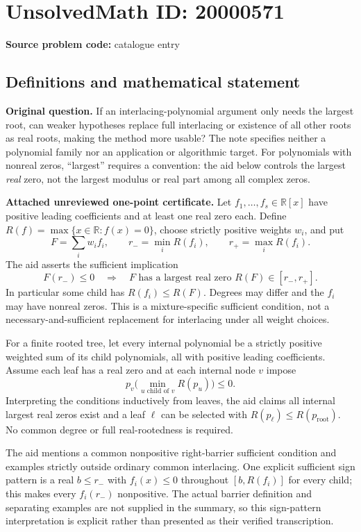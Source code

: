 \documentclass[11pt]{article}
\newcommand{\R}{\mathbb{R}}
\begin{document}
\section*{UnsolvedMath ID: 20000571}
\textbf{Source problem code:} catalogue entry
\subsection{Definitions and mathematical statement}
\textbf{Original question.} If an interlacing-polynomial argument only needs the largest root, can weaker hypotheses replace full interlacing or existence of all other roots as real roots, making the method more usable? The note specifies neither a polynomial family nor an application or algorithmic target. For polynomials with nonreal zeros, ``largest'' requires a convention: the aid below controls the largest \emph{real} zero, not the largest modulus or real part among all complex zeros.

\textbf{Attached unreviewed one-point certificate.} Let $f_1,\ldots,f_s\in\R[x]$ have positive leading coefficients and at least one real zero each. Define $R(f)=\max\{x\in\R:f(x)=0\}$, choose strictly positive weights $w_i$, and put
\[F=\sum_iw_if_i,\qquad r_-=\min_iR(f_i),\qquad r_+=\max_iR(f_i).\]
The aid asserts the sufficient implication
\[F(r_-)\le0\quad\Longrightarrow\quad F\text{ has a largest real zero }R(F)\in[r_-,r_+].\]
In particular some child has $R(f_i)\le R(F)$. Degrees may differ and the $f_i$ may have nonreal zeros. This is a mixture-specific sufficient condition, not a necessary-and-sufficient replacement for interlacing under all weight choices.

For a finite rooted tree, let every internal polynomial be a strictly positive weighted sum of its child polynomials, all with positive leading coefficients. Assume each leaf has a real zero and at each internal node $v$ impose
\[p_v\bigl(\min_{u\text{ child of }v}R(p_u)\bigr)\le0.\]
Interpreting the conditions inductively from leaves, the aid claims all internal largest real zeros exist and a leaf $\ell$ can be selected with $R(p_\ell)\le R(p_{\mathrm{root}})$. No common degree or full real-rootedness is required.

The aid mentions a common nonpositive right-barrier sufficient condition and examples strictly outside ordinary common interlacing. One explicit sufficient sign pattern is a real $b\le r_-$ with $f_i(x)\le0$ throughout $[b,R(f_i)]$ for every child; this makes every $f_i(r_-)$ nonpositive. The actual barrier definition and separating examples are not supplied in the summary, so this sign-pattern interpretation is explicit rather than presented as their verified transcription.
\end{document}
